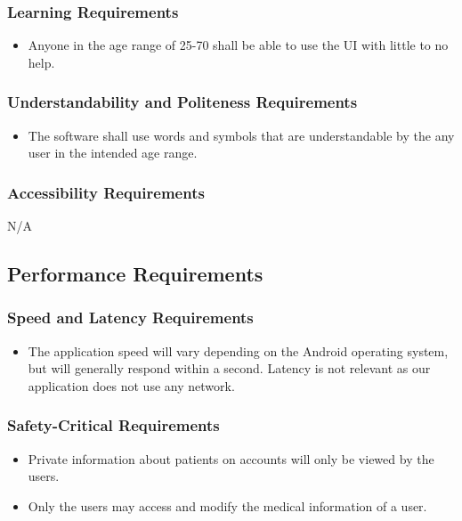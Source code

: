 \documentclass[12pt]{article}
\begin{document}
\subsubsection{Learning Requirements}
\begin{itemize}
\item Anyone in the age range of 25-70 shall be able to use the UI with little to no help.
\end{itemize}

\subsubsection{Understandability and Politeness Requirements}
\begin{itemize}
\item The software shall use words and symbols that are understandable by the any user in the intended age range.
\end{itemize}
\subsubsection{Accessibility Requirements}
N/A

\subsection{Performance Requirements}
\subsubsection{Speed and Latency Requirements}
\begin{itemize}
\item The application speed will vary depending on the Android operating system, but will generally respond within a second. Latency is not relevant as our application does not use any network.
\end{itemize}

\subsubsection{Safety-Critical Requirements}
\begin{itemize}
\item Private information about patients on accounts will only be viewed by the users.
\item Only the users may access and modify the medical information of a user.
\end{itemize}
\end{document}
